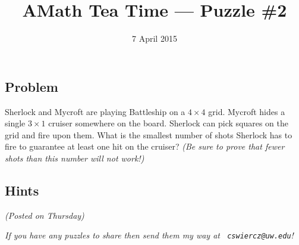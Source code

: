 \documentclass[12pt]{article}
\title{AMath Tea Time --- Puzzle \#2}
\author{}
\date{\vspace{-1cm}7 April 2015}
\begin{document}
\maketitle
{}

\subsection*{Problem}

Sherlock and Mycroft are playing Battleship on a $4 \times 4$ grid. Mycroft
hides a single $3 \times 1$ cruiser somewhere on the board. Sherlock can pick
squares on the grid and fire upon them. What is the smallest number of shots
Sherlock has to fire to guarantee at least one hit on the cruiser? {\it (Be sure
  to prove that fewer shots than this number will not work!)}

\begin{figure}[h]
  \centering
\end{figure}

\subsection*{Hints}

{\it (Posted on Thursday)}


{
\par\vspace*{\fill}
\noindent \small \it
If you have any puzzles to share then send them my way at {\tt
  cswiercz@uw.edu}!
}
\end{document}
